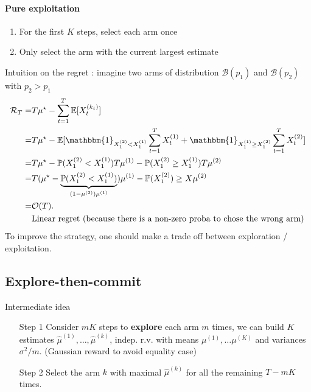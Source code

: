 \paragraph{Pure exploitation}
\begin{enumerate}
    \item For the first $K$ steps, select each arm once
    \item Only select the arm with the current largest estimate
\end{enumerate}
Intuition on the regret : imagine two arms of distribution $ \mathcal{B}(p_1) $ and $ \mathcal{B}(p_2) $ with $ p_2 > p_1 $
\begin{align*}
    \mathcal{R}_T 
        =& T \mu ^\star - \sum_{t=1}^{T}\mathbb{E}[X_t^{(k_t)}] \\
        =& T \mu ^\star - \mathbb{E}[\mathbbm{1}_{X_1^{(2)} < X_1^{(1)}} \sum_{t=1}^{T} X_t^{(1)} + \mathbbm{1}_{X_1^{(1)} \geq  X_1^{(2)}} \sum_{t=1}^{T} X_t^{(2)}] \\
        =& T \mu ^\star - \mathbb{P}(X_1^{(2)} < X_1^{(1)}) T \mu ^{(1)} - \mathbb{P}(X_1^{(2)} \geq X_1^{(1)}) T \mu ^{(2)} \\
        =& T (\mu ^\star - \underbrace{\mathbb{P}(X_1^{(2)} < X_1^{(1)})}_{(1 - \mu ^{(2)}) \mu ^{(1)}}) \mu ^{(1)} - \mathbb{P}(X_1 ^{(2)}) \geq X \mu ^{(2)} \\
        =& \mathcal{O}(T). \\
        &\text{Linear regret (because there is a non-zero proba to chose the wrong arm)}
\end{align*}
To improve the strategy, one should make a trade off between exploration / exploitation.

\subsection{Explore-then-commit}
Intermediate idea 
\begin{enumerate}
    \item [Step 1] Consider $ mK $ steps to \textbf{explore} each arm $ m $ times, we can build $ K $ estimates $ \hat{\mu }^{(1)}, \dots, \hat{\mu }^{(k)} $, indep. r.v. with means $\mu ^{(1)}, \dots \mu ^{(K)}$ and variances $\sigma ^2 /m$. (Gaussian reward to avoid equality case)
    \item [Step 2] Select the arm $ k $ with maximal $ \hat{\mu }^{(k)} $ for all the remaining $ T - mK $ times.
\end{enumerate}

